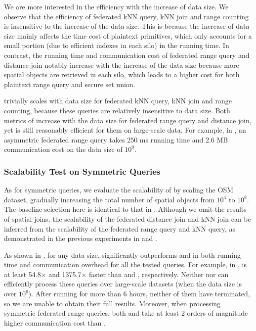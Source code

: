 We are more interested in the efficiency with the increase of data size.
We observe that the efficiency of federated kNN query, kNN join and range counting is insensitive to the increase of the data size.
This is because the increase of data size mainly affects the time cost of plaintext primitives, which only accounts for a small portion (due to efficient indexes in each silo) in the running time.
In contrast, the running time and communication cost of federated range query and distance join notably increase with the increase of the data size because more spatial objects are retrieved in each silo, which leads to a higher cost for both plaintext range query and secure set union.

\sysname trivially scales with data size for federated kNN query, kNN join and range counting, because these queries are relatively insensitive to data size.
Both metrics of \sysname increase with the data size for federated range query and distance join, yet \sysname is still reasonably efficient for them on large-scale data.
For example, in \sysname, an asymmetric federated range query takes 250 ms running time and 2.6 MB communication cost on the data size of $10^9$.

\subsubsection{Scalability Test on Symmetric Queries}
\label{subsec:exp-symm-scalability}

As for symmetric queries, we evaluate the scalability of \sysname by scaling the OSM dataset, gradually increasing the total number of spatial objects from $10^4$ to $10^8$.
The baseline selection here is identical to that in .
Although we omit the results of spatial joins,
the scalability of the federated distance join and kNN join can be inferred from the scalability of the federated range query and kNN query, as demonstrated in the previous experiments in  and .

As shown in , for any data size, \sysname significantly outperforms \conclave and \EDBT in both running time and communication overhead for all the tested queries. 
For example, in , \sysname is at least 54.8$\times$ and 1375.7$\times$ faster than \conclave and \EDBT, respectively. 
Neither \conclave nor \EDBT can efficiently process these queries over large-scale datasets (\eg when the data size is over $10^6$).
After running for more than 6 hours, neither of them have terminated, so we are unable to obtain their full results.
Moreover, when processing symmetric federated range queries, both \conclave and \EDBT take at least 2 orders of magnitude higher communication cost than \sysname.

